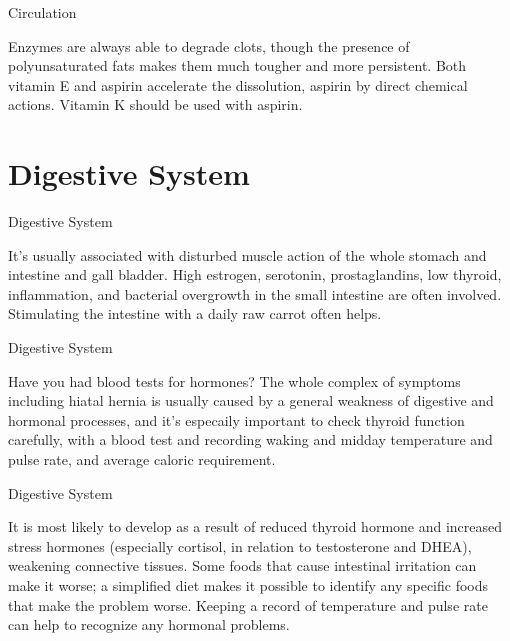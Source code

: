 \documentclass[11pt,oneside,openany,extrafontsizes]{memoir}
\begin{document}
\begin{standalonequote}{Circulation}

    \begin{answer}
       Enzymes are always able to degrade clots, though the presence of polyunsaturated fats makes them much tougher and more persistent. Both vitamin E and aspirin accelerate the dissolution, aspirin by direct chemical actions. Vitamin K should be used with aspirin. 
    \end{answer}
\end{standalonequote}

\section{Digestive System}

\begin{standalonequote}{Digestive System}

    \begin{answer}
        It's usually associated with disturbed muscle action of the whole stomach and intestine and gall bladder. High estrogen, serotonin, prostaglandins, low thyroid, inflammation, and bacterial overgrowth in the small intestine are often involved. Stimulating the intestine with a daily raw carrot often helps.
    \end{answer}
\end{standalonequote}

\begin{standalonequote}{Digestive System}

    \begin{answer}
        Have you had blood tests for hormones? The whole complex of symptoms including hiatal hernia is usually caused by a general weakness of digestive and hormonal processes, and it's especaily important to check thyroid function carefully, with a blood test and recording waking and midday temperature and pulse rate, and average caloric requirement.
    \end{answer}
\end{standalonequote}

\begin{standalonequote}{Digestive System}

    \begin{answer}
        It is most likely to develop as a result of reduced thyroid hormone and increased stress hormones (especially cortisol, in relation to testosterone and DHEA), weakening connective tissues. Some foods that cause intestinal irritation can make it worse; a simplified diet makes it possible to identify any specific foods that make the problem worse. Keeping a record of temperature and pulse rate can help to recognize any hormonal problems.
    \end{answer}
\end{standalonequote}
\end{document}
